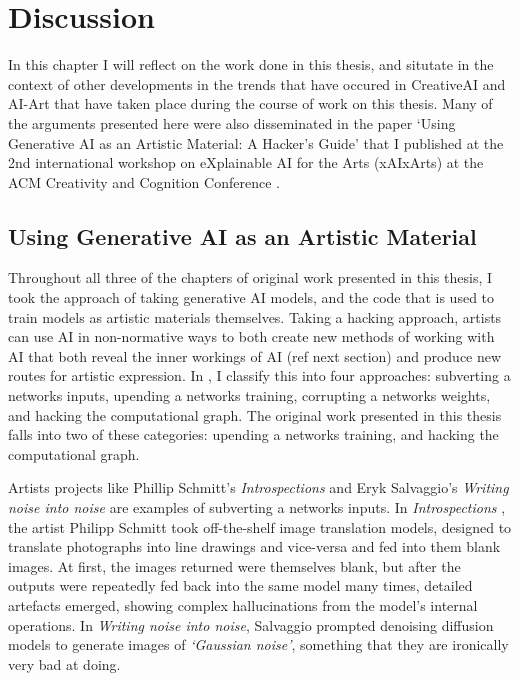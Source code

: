 \chapter{Discussion}
\label{ch:discussion}

In this chapter I will reflect on the work done in this thesis, and situtate in the context of other developments in the trends that have occured in CreativeAI and AI-Art that have taken place during the course of work on this thesis. 
Many of the arguments presented here were also disseminated in the paper `Using Generative AI as an Artistic Material: A Hacker's Guide’ that I published at the 2nd international workshop on eXplainable AI for the Arts (xAIxArts) at the ACM Creativity and Cognition Conference \citep{broad2024using}.

\section{Using Generative AI as an Artistic Material}

Throughout all three of the chapters of original work presented in this thesis, I took the approach of taking generative AI models, and the code that is used to train models as artistic materials themselves.
Taking a hacking approach, artists can use AI in non-normative ways to both create new methods of working with AI that both reveal the inner workings of AI (ref next section) and produce new routes for artistic expression. 
In \cite{broad2024using}, I classify this into four approaches: subverting a networks inputs, upending a networks training, corrupting a networks weights, and hacking the computational graph. 
The original work presented in this thesis falls into two of these categories: upending a networks training, and hacking the computational graph.

Artists projects like Phillip Schmitt's \textit{Introspections} \citep{schmitt2019introspections} and Eryk Salvaggio's \textit{Writing noise into noise} \citep{salvaggio2023noise} are examples of subverting a networks inputs. 
In \textit{Introspections} \cite{schmitt2019introspections}, the artist Philipp Schmitt took off-the-shelf image translation models, designed to translate photographs into line drawings and vice-versa and fed into them blank images. At first, the images returned were themselves blank, but after the outputs were repeatedly fed back into the same model many times, detailed artefacts emerged, showing complex hallucinations from the model's internal operations.
In \textit{Writing noise into noise}, Salvaggio prompted denoising diffusion models \cite{sohl2015deep} to generate images of \textit{`Gaussian noise'}, something that they are ironically very bad at doing.

